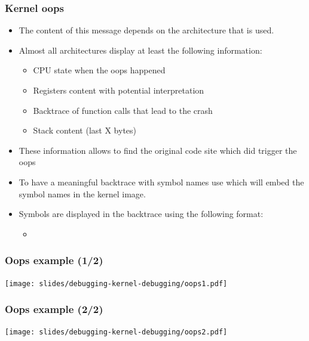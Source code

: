 \begin{frame}
  \frametitle{Kernel oops}
  \begin{itemize}
    \item The content of this message depends on the architecture that is used.
    \item Almost all architectures display at least the following information:
    \begin{itemize}
      \item CPU state when the oops happened
      \item Registers content with potential interpretation
      \item Backtrace of function calls that lead to the crash
      \item Stack content (last X bytes)
    \end{itemize}
    \item These information allows to find the original code site which did
          trigger the oops
    \item To have a meaningful backtrace with symbol names use
           which will embed the
          symbol names in the kernel image.
    \item Symbols are displayed in the backtrace using the following format:
    \begin{itemize}
      \item {}
    \end{itemize}
  \end{itemize}
\end{frame}

\begin{frame}
  \frametitle{Oops example (1/2)}
  \begin{center}
    \texttt{[image: slides/debugging-kernel-debugging/oops1.pdf]}
  \end{center}
\end{frame}

\begin{frame}
  \frametitle{Oops example (2/2)}
  \begin{center}
    \texttt{[image: slides/debugging-kernel-debugging/oops2.pdf]}
  \end{center}
\end{frame}

